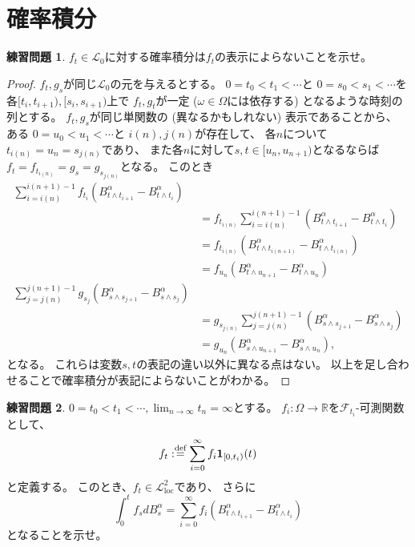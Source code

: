 \documentclass[uplatex]{jsarticle}
\theoremstyle{definition}
\newtheorem{prob}[prob]{練習問題}
\def\R{\mathbb{R}}
\def\I{\mathbf{1}}
\def\mcF{\mathcal{F}}
\def\mcL{\mathcal{L}}
\def\dfn{:\overset{\mbox{{\scriptsize def}}}{=}}
\begin{document}
\newpage
\section{確率積分}
\label{section 4}

\begin{prob}\label{prob: 4.1}
  \(f_t\in \mcL_0\)に対する確率積分は\(f_t\)の表示によらないことを示せ。
\end{prob}

\begin{proof}
  \(f_t,g_s\)が同じ\(\mcL_0\)の元を与えるとする。
  \(0=t_0 < t_1 < \cdots\)と
  \(0=s_0 < s_1 < \cdots\)を
  各\([t_i,t_{i+1}), [s_i,s_{i+1})\)上で
  \(f_t,g_t\)が一定 (\(\omega\in \Omega\)には依存する) となるような時刻の列とする。
  \(f_t,g_s\)が同じ単関数の (異なるかもしれない) 表示であることから、
  ある
  \(0=u_0 < u_1 < \cdots\)と
  \(i(n),j(n)\)が存在して、
  各\(n\)について\(t_{i(n)} = u_n = s_{j(n)}\)であり、
  また各\(n\)に対して\(s,t\in [u_n,u_{n+1})\)となるならば
  \(f_t = f_{t_{i(n)}} = g_s = g_{s_{j(n)}}\)となる。
  このとき
  \begin{align*}
    \sum_{i=i(n)}^{i(n+1)-1}f_{t_i}
    \left( B_{t\wedge t_{i+1}}^{\alpha}-B_{t\wedge t_i}^{\alpha}\right) \\
    &= f_{t_{i(n)}}\sum_{i=i(n)}^{i(n+1)-1}
    \left( B_{t\wedge t_{i+1}}^{\alpha}-B_{t\wedge t_i}^{\alpha}\right) \\
    &= f_{t_{i(n)}}
    \left( B_{t\wedge t_{i(n+1)}}^{\alpha}-B_{t\wedge t_{i(n)}}^{\alpha}\right) \\
    &= f_{u_n}
    \left( B_{t\wedge u_{n+1}}^{\alpha}-B_{t\wedge u_n}^{\alpha}\right) \\
    \sum_{j=j(n)}^{j(n+1)-1}g_{s_j}
    \left( B_{s\wedge s_{j+1}}^{\alpha}-B_{s\wedge s_j}^{\alpha}\right) \\
    &= g_{s_{j(n)}}\sum_{j=j(n)}^{j(n+1)-1}
    \left( B_{s\wedge s_{j+1}}^{\alpha}-B_{s\wedge s_j}^{\alpha}\right) \\
    &= g_{u_n}
    \left( B_{s\wedge u_{n+1}}^{\alpha}-B_{s\wedge u_n}^{\alpha}\right),
  \end{align*}
  となる。
  これらは変数\(s,t\)の表記の違い以外に異なる点はない。
  以上を足し合わせることで確率積分が表記によらないことがわかる。
\end{proof}




\begin{prob}\label{prob: 4.2}
  \(0=t_0 < t_1 < \cdots, \lim_{n\to \infty}t_n = \infty\)とする。
  \(f_i:\Omega \to \R \)を\(\mcF_{t_i}\)-可測関数として、
  \[
  f_t \dfn \sum_{i=0}^\infty f_i\I_{[0,t_i)}(t)
  \]
  と定義する。
  このとき、\(f_t\in \mcL_{\mathrm{loc}}^2\)であり、
  さらに
  \[
  \int_0^t f_sdB_s^\alpha
  = \sum_{i=0}^\infty f_i
  \left( B_{t\wedge t_{i+1}}^\alpha - B_{t\wedge t_i}^\alpha \right)
  \]
  となることを示せ。
\end{prob}
\end{document}
